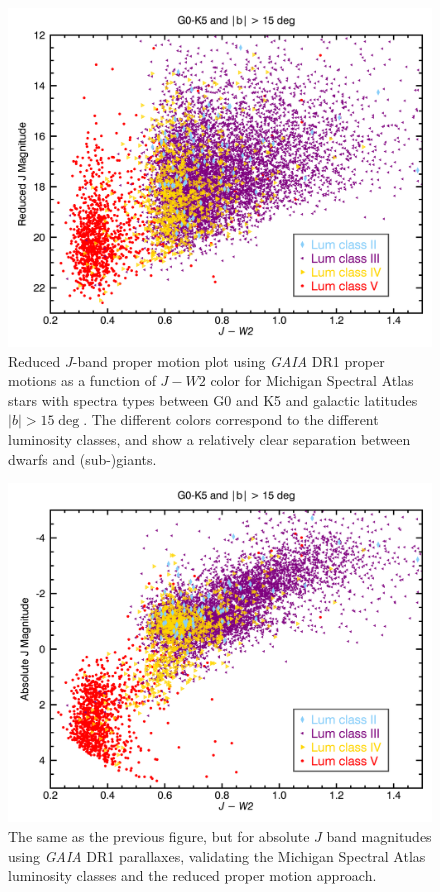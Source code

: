 \begin{figure}[t]
  \begin{center}
      \includegraphics[width=1.0\textwidth,clip=true]{Figures/absolute_j/plot-J-W2-G0-K5-b15-0.png}
 \end{center}
 \caption{Reduced $J$-band proper motion plot using \textit{GAIA} DR1 proper motions as a function of $J-W2$ color for Michigan Spectral Atlas stars with spectra types between G0 and K5 and galactic latitudes $|b|>15\deg$.  The different colors correspond to the different luminosity classes, and show a relatively clear separation between dwarfs and (sub-)giants.}
\end{figure}

\begin{figure}[t]
  \begin{center}
      \includegraphics[width=1.0\textwidth,clip=true]{Figures/absolute_j/plot-J-W2-G0-K5-b15-1.png}
 \end{center}
 \caption{The same as the previous figure, but for absolute $J$ band magnitudes using \textit{GAIA} DR1 parallaxes, validating the Michigan Spectral Atlas luminosity classes and the reduced proper motion approach.}
\end{figure}

